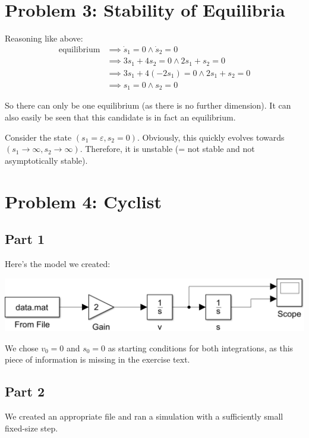 \documentclass[a4paper,parskip,headheight=38pt]{scrartcl} %
\begin{document}
\section*{Problem 3: Stability of Equilibria}

Reasoning like above:
\begin{align*}
    \text{equilibrium}
    &\implies \dot{s}_1 = 0 \land \dot{s}_2 = 0 \\
    &\implies 3s_1 + 4s_2 = 0 \land 2s_1 + s_2 = 0 \\
    &\implies 3s_1 + 4(-2s_1) = 0 \land 2s_1 + s_2 = 0 \\
    &\implies s_1 = 0 \land s_2 = 0
\end{align*}

So there can only be one equilibrium (as there is no further
dimension).  It can also easily be seen that this candidate is in fact
an equilibrium.

Consider the state $(s_1=\varepsilon, s_2 = 0)$.  Obviously, this
quickly evolves towards $(s_1 \to \infty, s_2 \to \infty)$.  Therefore,
it is unstable (= not stable and not asymptotically stable).


\section*{Problem 4: Cyclist}

\subsection*{Part 1}

Here's the model we created:

\includegraphics[width=\textwidth]{p4a-proof}

We chose $v_{0} = 0$ and $s_{0} = 0$ as starting conditions for both
integrations, as this piece of information is missing in the exercise
text.

\subsection*{Part 2}

We created an appropriate file and ran a simulation with a sufficiently
small fixed-size step.
\end{document}
